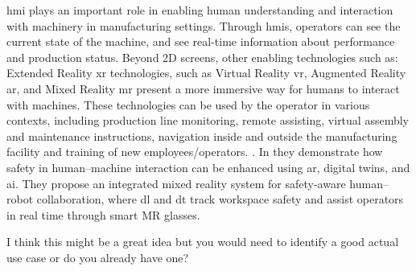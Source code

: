 \ac{hmi} plays an important role in enabling human understanding and interaction with machinery in manufacturing settings. 
Through \ac{hmi}s, operators can see the current state of the machine, and see real-time information about performance and production status.
Beyond 2D screens, other enabling technologies such as: Extended Reality \ac{xr} technologies, such as Virtual Reality \ac{vr}, Augmented Reality \ac{ar}, 
and Mixed Reality \ac{mr} present a more immersive way for humans to interact with machines.
These technologies can be used by the operator in various contexts, including production line monitoring, remote assisting, virtual assembly and 
maintenance instructions, navigation inside and outside the manufacturing facility and training of new employees/operators.
\cite{en15176276}. %
In \cite{CHOI2022102258} they demonstrate how safety in human–machine interaction can be enhanced using \ac{ar}, digital twins, and \ac{ai}.
They propose an integrated mixed reality system for safety-aware human–robot collaboration, where \ac{dl} and \ac{dt} track workspace safety and assist operators in real time through smart MR glasses.


I think this might be a great idea but you would need to identify a good actual use case or do you already have one?

